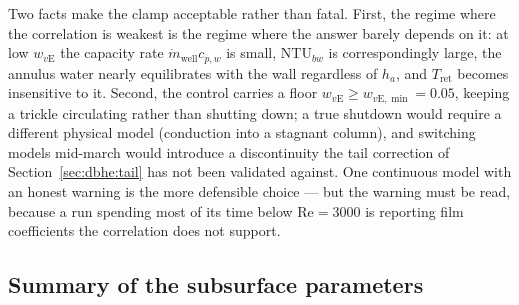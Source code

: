 \documentclass[11pt]{article}
\begin{document}
Two facts make the clamp acceptable rather than fatal. First, the regime where
the correlation is weakest is the regime where the answer barely depends on it:
at low $w_{v\mathrm{E}}$ the capacity rate $\dot m_{\mathrm{well}}c_{p,w}$ is
small, $\mathrm{NTU}_{bw}$ is correspondingly large, the annulus water nearly
equilibrates with the wall regardless of $h_a$, and $T_{\mathrm{ret}}$ becomes
insensitive to it. Second, the control carries a floor
$w_{v\mathrm{E}}\ge w_{v\mathrm{E},\min}=0.05$, keeping a trickle circulating
rather than shutting down; a true shutdown would require a different physical
model (conduction into a stagnant column), and switching models mid-march would
introduce a discontinuity the tail correction of
Section~\ref{sec:dbhe:tail} has not been validated against. One continuous model
with an honest warning is the more defensible choice --- but the warning must be
read, because a run spending most of its time below $\mathrm{Re}=3000$ is
reporting film coefficients the correlation does not support.

\subsection{Summary of the subsurface parameters}
\label{sec:dbhe:params}
\end{document}
